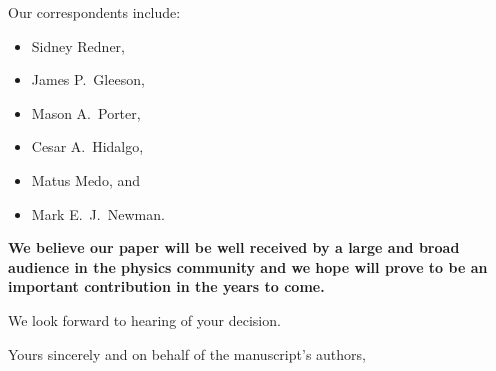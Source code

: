 Our correspondents include:
\begin{itemize}
\item 
  Sidney Redner,
\item 
  James P.\ Gleeson,
\item 
  Mason A.\ Porter,
\item 
  Cesar A.\ Hidalgo,
\item 
  Matus Medo, and 
\item 
  Mark E.\ J.\ Newman.
\end{itemize}

\textbf{We believe our paper will be well received by a large and broad audience 
in the physics community and we hope will prove to 
be an important contribution in the years to come.} 




We look forward to hearing of your decision.

Yours sincerely and on behalf of the manuscript's authors,


